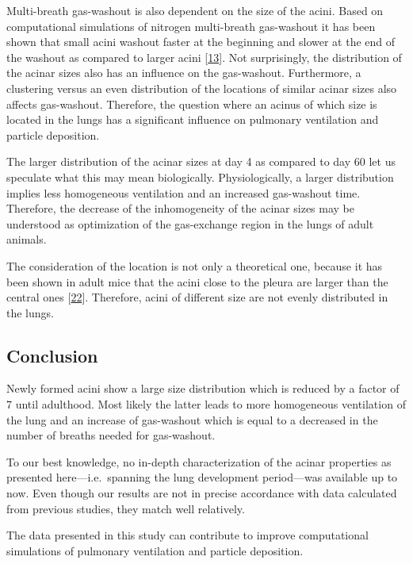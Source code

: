 \documentclass[
  american,
]{article}
\begin{document}
Multi-breath gas-washout is also dependent on the size of the acini.
Based on computational simulations of nitrogen multi-breath gas-washout it has been shown that small acini washout faster at the beginning and slower at the end of the washout as compared to larger acini {[}\protect\hyperlink{ref-eb0gk6VO}{13}{]}.
Not surprisingly, the distribution of the acinar sizes also has an influence on the gas-washout.
Furthermore, a clustering versus an even distribution of the locations of similar acinar sizes also affects gas-washout.
Therefore, the question where an acinus of which size is located in the lungs has a significant influence on pulmonary ventilation and particle deposition.

The larger distribution of the acinar sizes at day 4 as compared to day 60 let us speculate what this may mean biologically.
Physiologically, a larger distribution implies less homogeneous ventilation and an increased gas-washout time.
Therefore, the decrease of the inhomogeneity of the acinar sizes may be understood as optimization of the gas-exchange region in the lungs of adult animals.

The consideration of the location is not only a theoretical one, because it has been shown in adult mice that the acini close to the pleura are larger than the central ones {[}\protect\hyperlink{ref-RGBeCf8v}{22}{]}.
Therefore, acini of different size are not evenly distributed in the lungs.

\hypertarget{conclusion}{%
\subsection{Conclusion}\label{conclusion}}

Newly formed acini show a large size distribution which is reduced by a factor of 7 until adulthood.
Most likely the latter leads to more homogeneous ventilation of the lung and an increase of gas-washout which is equal to a decreased in the number of breaths needed for gas-washout.

To our best knowledge, no in-depth characterization of the acinar properties as presented here---i.e.~spanning the lung development period---was available up to now.
Even though our results are not in precise accordance with data calculated from previous studies, they match well relatively.

The data presented in this study can contribute to improve computational simulations of pulmonary ventilation and particle deposition.
\end{document}
